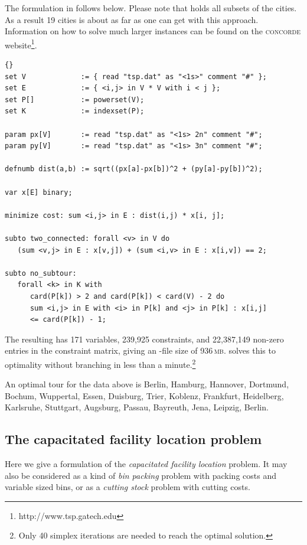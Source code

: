 \noindent The formulation in \zimpl follows below. Please note that 
holds all subsets of the cities. As a result
19 cities is about as far as one can get with this approach.
Information on how to solve much larger instances can be found on the
\textsc{concorde} website\footnote{http://www.tsp.gatech.edu}.

\medskip
{}
\begin{lstlisting}[frame=tb]{}
set V             := { read "tsp.dat" as "<1s>" comment "#" };
set E             := { <i,j> in V * V with i < j };
set P[]           := powerset(V);
set K             := indexset(P);

param px[V]       := read "tsp.dat" as "<1s> 2n" comment "#";
param py[V]       := read "tsp.dat" as "<1s> 3n" comment "#";

defnumb dist(a,b) := sqrt((px[a]-px[b])^2 + (py[a]-py[b])^2);

var x[E] binary;

minimize cost: sum <i,j> in E : dist(i,j) * x[i, j];

subto two_connected: forall <v> in V do
   (sum <v,j> in E : x[v,j]) + (sum <i,v> in E : x[i,v]) == 2;

subto no_subtour:
   forall <k> in K with
      card(P[k]) > 2 and card(P[k]) < card(V) - 2 do
      sum <i,j> in E with <i> in P[k] and <j> in P[k] : x[i,j]
      <= card(P[k]) - 1;
\end{lstlisting}

\medskip
\noindent The resulting \lp has 171 variables, 239,925 constraints, and
22,387,149 non-zero entries in the constraint matrix, giving an \mps-file
size of 936\,\textsc{mb}. \cplex solves this to optimality
without branching in less than a minute.\footnote{Only 40
simplex iterations are needed to reach the optimal solution.}

An optimal tour for the data above is
Berlin, Hamburg, Hannover, Dortmund, Bo\-chum, Wuppertal, Essen,
Duisburg, Trier, Koblenz, Frankfurt, Heidelberg, Karlsruhe, Stuttgart,
Augsburg, Passau, Bayreuth, Jena, Leipzig, Berlin.


\subsection{The capacitated facility location problem}
Here we give a formulation of the \emph{capacitated facility
location} problem. It may also be considered as a kind of \emph{bin packing} problem
with packing costs and variable sized bins, or as a \emph{cutting stock} problem
with cutting costs.

